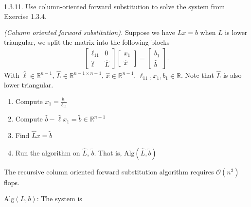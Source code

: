 \documentclass{report}
\begin{document}
    \pagebreak \bigbreak \noindent 
    \begin{mdframed}
        1.3.11. Use column-oriented forward substitution to solve the system from Exercise 1.3.4.
    \end{mdframed}
    \bigbreak \noindent 
    \begin{remark}
       \textit{(Column oriented forward substitution).} 
        Suppose we have $Lx = b$ when $L$ is lower triangular, we split the matrix into the following blocks
            \begin{align*}
                \begin{bmatrix}
                    \ell_{11} & 0 \\
                    \hat{\ell} & \hat{L}
                \end{bmatrix}
                \begin{bmatrix}
                    x_{1} \\ \hat{x} 
                \end{bmatrix}
                = \begin{bmatrix}
                    b_{1} \\ \hat{b}
                \end{bmatrix}
            .\end{align*}
            With $\hat{\ell} \in \mathbb{R}^{n-1}$, $\hat{L} \in \mathbb{R}^{n-1 \times n-1} $, $\hat{x} \in \mathbb{R}^{n-1}$, $\ell_{11}, x_{1}, b_{1} \in \mathbb{R}$. Note that $\hat{L}$ is also lower triangular.
            \begin{enumerate}
                \item Compute $x_{1} = \frac{b_{1}}{\ell_{11}} $
                \item Compute $\hat{b} - \hat{\ell}x_{1} = \tilde{b} \in \mathbb{R}^{n-1} $
                \item Find $\hat{L}x = \tilde{b} $
                \item Run the algorithm on $\hat{L}$, $\tilde{b}$. That is, $\text{Alg}(\hat{L}, \tilde{b}) $
            \end{enumerate}
            The recursive column oriented forward substitution algorithm requires $\mathcal{O}(n^{2})$ flops.
        \end{remark}
        \bigbreak \noindent 
        Alg$(L,b)$: The system is
\end{document}
